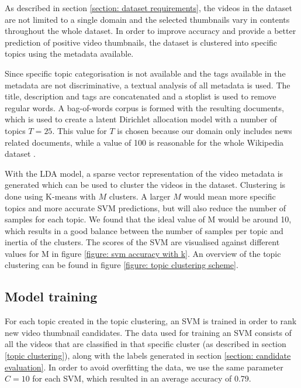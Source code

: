 \documentclass{../resources/sig-alternate-05-2015}
\begin{document}
As described in section \ref{section: dataset requirements}, the videos in the dataset are not limited to a single domain and the selected thumbnails vary in contents throughout the whole dataset. In order to improve accuracy and provide a better prediction of positive video thumbnails, the dataset is clustered into specific topics using the metadata available.

Since specific topic categorisation is not available and the tags available in the metadata are not discriminative, a textual analysis of all metadata is used. The title, description and tags are concatenated and a stoplist is used to remove regular words. A bag-of-words corpus is formed with the resulting documents, which is used to create a latent Dirichlet allocation model with a number of topics $T = 25$. This value for $T$ is chosen because our domain only includes news related documents, while a value of 100 is reasonable for the whole Wikipedia dataset \cite{Newman:2009uk,Blei:2003tn}.

With the LDA model, a sparse vector representation of the video metadata is generated which can be used to cluster the videos in the dataset. Clustering is done using K-means with $M$ clusters. A larger $M$ would mean more specific topics and more accurate SVM predictions, but will also reduce the number of samples for each topic. We found that the ideal value of M would be around 10, which results in a good balance between the number of samples per topic and inertia of the clusters. The scores of the SVM are visualised against different values for M in figure \ref{figure: svm accuracy with k}. An overview of the topic clustering can be found in figure \ref{figure: topic clustering scheme}.

\subsection{Model training}
\label{section: model training}

For each topic created in the topic clustering, an SVM is trained in order to rank new video thumbnail candidates. The data used for training an SVM consists of all the videos that are classified in that specific cluster (as described in section \ref{topic clustering}), along with the labels generated in section \ref{section: candidate evaluation}. In order to avoid overfitting the data, we use the same parameter $C = 10$ for each SVM, which resulted in an average accuracy of 0.79.
\end{document}
